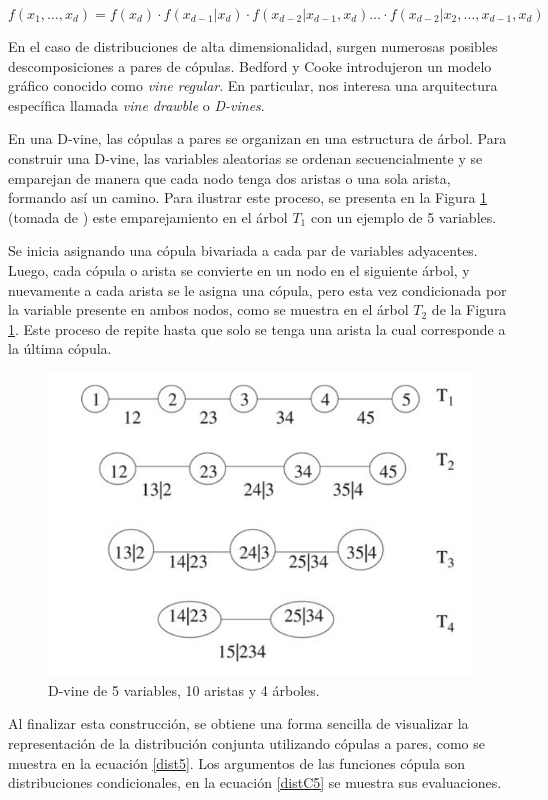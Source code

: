 \begin{equation}\label{fact1}
    f(x_1, \dots, x_d) = f(x_d) \cdot f(x_{d-1}|x_d) \cdot f(x_{d-2} | x_{d-1}, x_{d}) \dots \cdot  f(x_{d-2} | x_{2}, \dots, x_{d-1}, x_{d})
\end{equation}

En el caso de distribuciones de alta dimensionalidad, surgen numerosas posibles descomposiciones a pares de cópulas. Bedford y Cooke introdujeron un modelo gráfico conocido como \textit{vine regular}. En particular, nos interesa una arquitectura específica llamada \textit{vine drawble} o \textit{D-vines}.

En una D-vine, las cópulas a pares se organizan en una estructura de árbol. Para construir una D-vine, las variables aleatorias se ordenan secuencialmente y se emparejan de manera que cada nodo tenga dos aristas o una sola arista, formando así un camino. Para ilustrar este proceso, se presenta en la Figura \ref{fig:Dvine5} (tomada de \cite{PairCopula}) este emparejamiento en el árbol $T_1$ con un ejemplo de 5 variables.

Se inicia asignando una cópula bivariada a cada par de variables adyacentes. Luego, cada cópula o arista se convierte en un nodo en el siguiente árbol, y nuevamente a cada arista se le asigna una cópula, pero esta vez condicionada por la variable presente en ambos nodos, como se muestra en el árbol $T_2$ de la Figura \ref{fig:Dvine5}. Este proceso de repite hasta que solo se tenga una arista la cual corresponde a la última cópula. 

\begin{figure}[H]
    \centering
    \includegraphics[width = 0.6 \textwidth]{Imagenes/Dvine5var.png}
    \caption{D-vine de 5 variables, 10 aristas y 4 árboles.}
    \label{fig:Dvine5}
\end{figure}

Al finalizar esta construcción, se obtiene una forma sencilla de visualizar la representación de la distribución conjunta utilizando cópulas a pares, como se muestra en la ecuación \eqref{dist5}. Los argumentos de las funciones cópula son distribuciones condicionales, en la ecuación \eqref{distC5} se muestra sus evaluaciones.

